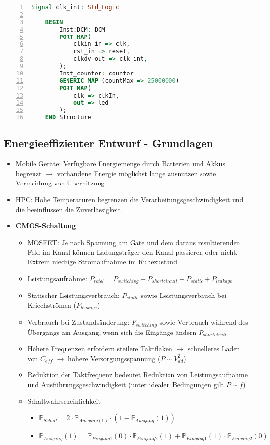 \begin{itemize}
\begin{itemize}
\begin{minipage}{\linewidth}
\begin{lstlisting}[frame=single,numbers=left,mathescape,language=VHDL,tabsize=4]
	Signal clk_int: Std_Logic

	BEGIN
		Inst:DCM: DCM
		PORT MAP(
			clkin_in => clk,
			rst_in => reset,
			clkdv_out => clk_int,
		);
		Inst_counter: counter
		GENERIC MAP (countMax => 25000000)
		PORT MAP(
			clk => clkIn,
			out => led
		);
	END Structure
			\end{lstlisting}
			\end{minipage}
	\end{itemize}
\end{itemize}


\subsection{Energieeffizienter Entwurf - Grundlagen}
\begin{itemize}
	\item Mobile Geräte: Verfügbare Energiemenge durch Batterien und Akkus begrenzt \(\rightarrow\) vorhandene Energie möglichst lange ausnutzen sowie Vermeidung von Überhitzung
	\item HPC: Hohe Temperaturen begrenzen die Verarbeitungsgeschwindigkeit und die beeinflussen die Zuverlässigkeit
	\item \textbf{CMOS-Schaltung}
	\begin{itemize}
		\item MOSFET: Je nach Spannung am Gate und dem daraus resultierenden Feld im Kanal können Ladungsträger den Kanal passieren oder nicht. Extrem niedrige Stromaufnahme im Ruhezustand
		\item Leistungsaufnahme: \(P_{total} = P_{switching} + P_{shortcircuit} + P_{static} + P_{leakage}\)
		\item Statischer Leistungsverbrauch: \(P_{static}\) sowie Leistungsverbauch bei Kriechströmen (\(P_{leakage}\))
		\item Verbrauch bei Zustandsänderung: \(P_{switching}\) sowie Verbrauch während des Übergangs am Ausgang, wenn sich die Eingänge ändern \(P_{shortciruit}\)
		\item Höhere Frequenzen erfordern steilere Taktflaken \(\rightarrow\) schnelleres Laden von \(C_{eff}\) \(\rightarrow\) höhere Versorgungsspannung (\(P \sim V^2_{dd}\))
		\item Reduktion der Taktfrequenz bedeutet Reduktion von Leistungsaufnahme und Ausführungsgeschwindigkeit (unter idealen Bedingungen gilt \(P \sim f\))
		\item Schaltwahrscheinlichkeit
		\begin{itemize}
			\item \(\mathbb{P}_{Schalt} = 2 \cdot \mathbb{P}_{Ausgang(1)} \cdot (1-\mathbb{P}_{Ausgang}(1))\)
			\item \(\mathbb{P}_{Ausgang}(1) = \mathbb{P}_{Eingang1}(0) \cdot \mathbb{P}_{Eingang2}(1) + \mathbb{P}_{Eingang1}(1) \cdot \mathbb{P}_{Eingang2}(0)\)
		\end{itemize}
	\end{itemize}
\end{itemize}


